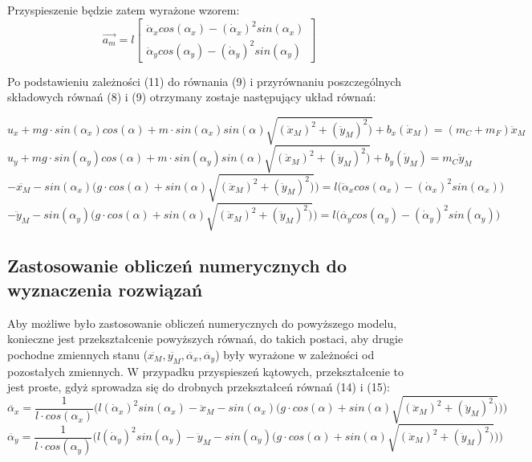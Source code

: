 \documentclass[10pt]{article}
\begin{document}
Przyspieszenie będzie zatem wyrażone wzorem:
\begin{equation}
\vec{a_m} = l
\begin{bmatrix}
\ddot{\alpha}_x cos(\alpha_x) - (\dot{\alpha}_x)^2 sin(\alpha_x) \\
\ddot{\alpha}_y cos(\alpha_y) - (\dot{\alpha}_y)^2 sin(\alpha_y)
\end{bmatrix}
\end{equation}

Po podstawieniu zależności (11) do równania (9) i przyrównaniu poszczególnych składowych równań (8) i (9) otrzymany zostaje następujący układ równań:

\begin{equation}
u_x + mg \cdot sin(\alpha_x) cos(\alpha) + m \cdot sin(\alpha_x) sin(\alpha) \sqrt{(\ddot{x}_M)^2 + (\ddot{y}_M)^2)} + b_x(\dot{x}_M) = (m_C + m_F) \ddot{x}_M
\end{equation}
\begin{equation}
u_y + mg \cdot sin(\alpha_y) cos(\alpha) + m \cdot sin(\alpha_y) sin(\alpha) \sqrt{(\ddot{x}_M)^2 + (\ddot{y}_M)^2)} + b_y(\dot{y}_M) = m_C \ddot{y}_M
\end{equation}
\begin{equation}
-\ddot{x_M}-sin(\alpha_x) \Big( g \cdot cos(\alpha) + sin(\alpha)\sqrt{(\ddot{x}_M)^2 + (\ddot{y}_M)^2)} \Big) = l \big( \ddot{\alpha}_x cos(\alpha_x) - (\dot{\alpha}_x)^2 sin(\alpha_x) \big)
\end{equation}
\begin{equation}
-\ddot{y}_M-sin(\alpha_y) \Big( g \cdot cos(\alpha) + sin(\alpha)\sqrt{(\ddot{x}_M)^2 + (\ddot{y}_M)^2)} \Big) = l \big( \ddot{\alpha_y} cos(\alpha_y) - (\dot{\alpha}_y)^2 sin(\alpha_y) \big)
\end{equation}

\newpage
\subsection*{Zastosowanie obliczeń numerycznych do wyznaczenia rozwiązań}
Aby możliwe było zastosowanie obliczeń numerycznych do powyższego modelu, konieczne jest przekształcenie powyższych równań, do takich postaci, aby drugie pochodne zmiennych stanu ($\ddot{x_M}, \ddot{y_M}, \ddot{\alpha_x}, \ddot{\alpha_y}$) były wyrażone w zależności od pozostałych zmiennych. W przypadku przyspieszeń kątowych, przekształcenie to jest proste, gdyż sprowadza się do drobnych przekształceń równań (14) i (15):
\begin{equation}
\ddot{\alpha_x} = \frac{1}{l \cdot cos(\alpha_x)} \bigg(l (\dot{\alpha}_x)^2 sin(\alpha_x) - \ddot{x}_M-sin(\alpha_x) \Big( g \cdot cos(\alpha) + sin(\alpha)\sqrt{(\ddot{x}_M)^2 + (\ddot{y}_M)^2)} \Big) \bigg)
\end{equation}
\begin{equation}
\ddot{\alpha_y} = \frac{1}{l \cdot cos(\alpha_y)} \bigg(l (\dot{\alpha}_y)^2 sin(\alpha_y) - \ddot{y}_M-sin(\alpha_y) \Big( g \cdot cos(\alpha) + sin(\alpha)\sqrt{(\ddot{x}_M)^2 + (\ddot{y}_M)^2)} \Big) \bigg)
\end{equation}
\end{document}
